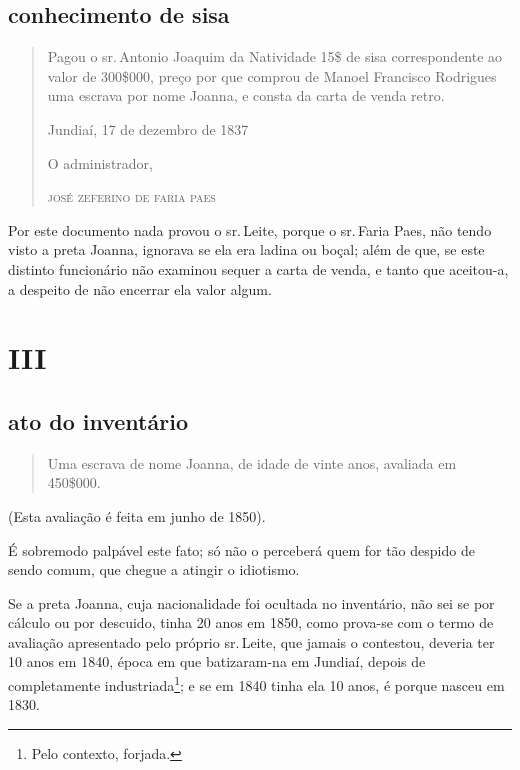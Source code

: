 \subsection{conhecimento de sisa\protect\footnotemark}


\begin{quote}
Pagou o sr.\,Antonio Joaquim da Natividade 15\$ de sisa correspondente
ao valor de 300\$000, preço por que comprou de Manoel Francisco
Rodrigues uma escrava por nome Joanna, e consta da carta de venda
retro.

\begin{flushright}
Jundiaí, 17 de dezembro de 1837

O administrador,

\textsc{josé zeferino de faria paes}
\end{flushright}
\end{quote}

Por este documento nada provou o sr.\,Leite, porque o sr.\,Faria Paes, não
tendo visto a preta Joanna, ignorava se ela era ladina ou boçal; além de
que, se este distinto funcionário não examinou sequer a carta de venda,
e tanto que aceitou-a, a despeito de não encerrar ela valor algum.

\section{III}

\subsection{ato do inventário}

\begin{quote}
Uma escrava de nome Joanna, de idade de vinte anos, avaliada em
450\$000.
\end{quote}

(Esta avaliação é feita em junho de 1850).

É sobremodo palpável este fato; só não o perceberá quem for tão despido
de sendo comum, que chegue a atingir o idiotismo.

Se a preta Joanna, cuja nacionalidade foi ocultada no inventário, não
sei se por cálculo ou por descuido, tinha 20 anos em 1850, como prova-se
com o termo de avaliação apresentado pelo próprio sr.\,Leite, que jamais
o contestou, deveria ter 10 anos em 1840, época em que batizaram-na em
Jundiaí, depois de completamente industriada\footnote{ Pelo contexto,
  forjada.}; e se em 1840 tinha ela 10 anos, é porque nasceu em 1830.

